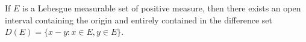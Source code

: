 If $E$ is a Lebesgue measurable set of positive measure, then there exists an open interval containing the origin and entirely contained in the difference set $D(E) = \{x - y : x \in E, y \in E\}$.
